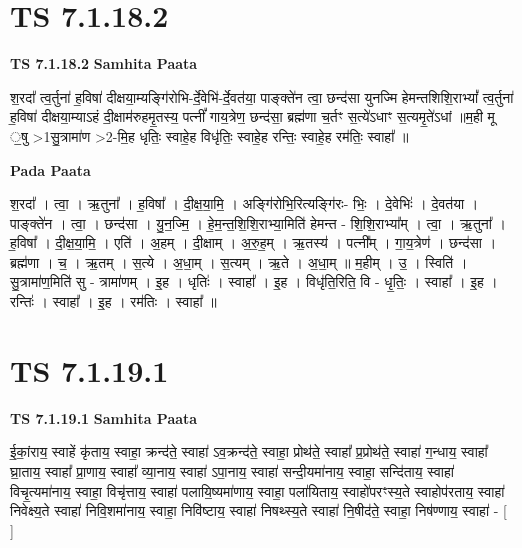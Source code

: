 \documentclass[17pt]{extarticle}
\begin{document}

\section{ TS 7.1.18.2 }

\textbf{TS 7.1.18.2 } \newline
\textbf{Samhita Paata} \newline

श॒रदा᳚ त्व॒र्तुना॑ ह॒विषा॑ दीक्षया॒म्यङ्गि॑रोभि-र्दे॒वेभि॑-र्दे॒वत॑या॒ पाङ्क्ते॑न त्वा॒ छन्द॑सा युनज्मि हेमन्तशिशि॒राभ्यां᳚ त्व॒र्तुना॑ ह॒विषा॑ दीक्षया॒म्याऽहं दी॒क्षाम॑रुहमृ॒तस्य॒ पत्नीं᳚ गाय॒त्रेण॒ छन्द॑सा॒ ब्रह्म॑णा च॒र्तꣳ स॒त्ये॑ऽधाꣳ स॒त्यमृ॒ते॑ऽधां ॥म॒ही मू ॒षु >1सु॒त्रामा॑ण >2-मि॒ह धृतिः॒ स्वाहे॒ह विधृ॑तिः॒ स्वाहे॒ह रन्तिः॒ स्वाहे॒ह रम॑तिः॒ स्वाहा᳚ ॥ \newline

\textbf{Pada Paata} \newline

श॒रदा᳚ । त्वा॒ । ऋ॒तुना᳚ । ह॒विषा᳚ । दी॒क्ष॒या॒मि॒ । अङ्गि॑रोभि॒रित्यङ्गि॑रः- भिः॒ । दे॒वेभिः॑ । दे॒वत॑या । पाङ्क्ते॑न । त्वा॒ । छन्द॑सा । यु॒न॒ज्मि॒ । हे॒म॒न्त॒शि॒शि॒राभ्या॒मिति॑ हेमन्त - शि॒शि॒राभ्या᳚म् । त्वा॒ । ऋ॒तुना᳚ । ह॒विषा᳚ । दी॒क्ष॒या॒मि॒ । एति॑ । अ॒हम् । दी॒क्षाम् । अ॒रु॒ह॒म् । ऋ॒तस्य॑ । पत्नी᳚म् । गा॒य॒त्रेण॑ । छन्द॑सा । ब्रह्म॑णा । च॒ । ऋ॒तम् । स॒त्ये । अ॒धा॒म् । स॒त्यम् । ऋ॒ते । अ॒धा॒म् ॥ म॒हीम् । उ॒ । स्विति॑ । सु॒त्रामा॑ण॒मिति॑ सु - त्रामा॑णम् । इ॒ह । धृतिः॑ । स्वाहा᳚ । इ॒ह । विधृ॑ति॒रिति॒ वि - धृ॒तिः॒ । स्वाहा᳚ । इ॒ह । रन्तिः॑ । स्वाहा᳚ । इ॒ह । रम॑तिः । स्वाहा᳚ ॥  \newline





\section{ TS 7.1.19.1 }

\textbf{TS 7.1.19.1 } \newline
\textbf{Samhita Paata} \newline

ई॒कां॒राय॒ स्वाहें कृ॑ताय॒ स्वाहा॒ क्रन्द॑ते॒ स्वाहा॑ ऽव॒क्रन्द॑ते॒ स्वाहा॒ प्रोथ॑ते॒ स्वाहा᳚ प्र॒प्रोथ॑ते॒ स्वाहा॑ ग॒न्धाय॒ स्वाहा᳚ घ्रा॒ताय॒ स्वाहा᳚ प्रा॒णाय॒ स्वाहा᳚ व्या॒नाय॒ स्वाहा॑ ऽपा॒नाय॒ स्वाहा॑ सन्दी॒यमा॑नाय॒ स्वाहा॒ सन्दि॑ताय॒ स्वाहा॑ विचृ॒त्यमा॑नाय॒ स्वाहा॒ विचृ॑त्ताय॒ स्वाहा॑ पलायि॒ष्यमा॑णाय॒ स्वाहा॒ पला॑यिताय॒ स्वाहो॑परꣳस्य॒ते स्वाहोप॑रताय॒ स्वाहा॑ निवेक्ष्य॒ते स्वाहा॑ निवि॒शमा॑नाय॒ स्वाहा॒ निवि॑ष्टाय॒ स्वाहा॑ निषथ्स्य॒ते स्वाहा॑ नि॒षीद॑ते॒ स्वाहा॒ निष॑ण्णाय॒ स्वाहा॑ - [  ] \newline
\end{document}

